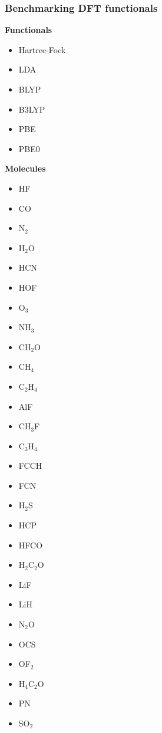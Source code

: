 \begin{frame}
\frametitle{Benchmarking DFT functionals}

\centering
\textbf{Functionals}
\begin{multicols}{3}
\begin{itemize}
    \item Hartree-Fock
    \item LDA
    \item BLYP
    \item B3LYP
    \item PBE
    \item PBE0
\end{itemize}
\end{multicols}

\vspace{5mm}

\textbf{Molecules}
\begin{multicols}{4}
\begin{itemize}
    \item HF
    \item CO
    \item N$_2$
    \item H$_2$O
    \item HCN
    \item HOF
    \item O$_3$
    \item NH$_3$      
    \item CH$_2$O     
    \item CH$_4$      
    \item C$_2$H$_4$  
    \item AlF         
    \item CH$_3$F     
    \item C$_3$H$_4$  
    \item FCCH        
    \item FCN         
    \item H$_2$S      
    \item HCP         
    \item HFCO        
    \item H$_2$C$_2$O 
    \item LiF         
    \item LiH        
    \item N$_2$O     
    \item OCS        
    \item OF$_2$     
    \item H$_4$C$_2$O
    \item PN         
    \item SO$_2$     
\end{itemize}
\end{multicols}
\end{frame}

